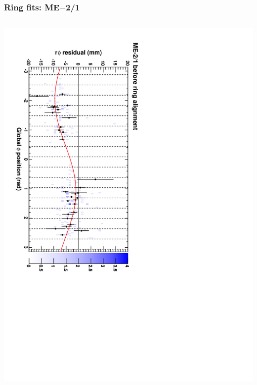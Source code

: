\documentclass[compress]{beamer}
\begin{document}
\begin{frame}
\frametitle{Ring fits: ME$-$2/1}
\vfill
\begin{columns}
\includegraphics[height=\linewidth, angle=90]{ringfits_before/mem21.pdf}


\end{columns}
\end{frame}
\end{document}
